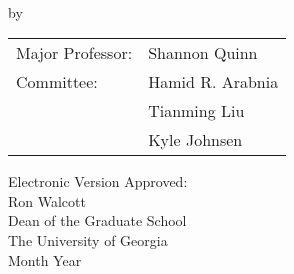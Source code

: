 \documentclass[12pt, notitlepage, twoside]{report}
\begin{document}

\newcommand{\degreesearned}{%
  M.S., Iran University of Science and Technology (IUST), Iran, 2016 \\
}%

\newcommand{\degreetype}{Dissertation}
\newcommand{\degreetitle}{Doctor of Philosophy}
\newcommand{\degreename}{in Computer Science}
\newcommand{\degreeyear}{2025}
\maketitlepage





\newpage
\thispagestyle{empty}
\vspace*{18pt}
\begin{center}
  \textsc{\doctitle}\\[18pt]
  by\\[18pt]
  \textsc{\docauthor}
\end{center}
\vfill

\begin{flushright}
  \begin{tabular}{ll}
    Major Professor: & Shannon Quinn    \\ [8pt]
    Committee:       & Hamid R. Arabnia \\
                     & Tianming Liu     \\
                     & Kyle Johnsen     \\
  \end{tabular}
\end{flushright}

\vspace*{3cm}

\begin{flushleft}
  Electronic Version Approved:\\[12pt]
  Ron Walcott\\
  Dean of the Graduate School\\
  The University of Georgia\\
  Month Year
\end{flushleft}
\vspace*{1.5cm}

% 
\end{document}
